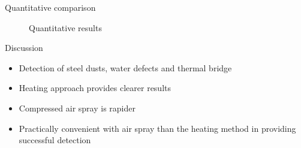 \begin{frame}{Quantitative comparison}

    \begin{figure}
        \hspace*{-20pt}
        \caption{Quantitative results}

    \end{figure}
\end{frame}


\begin{frame}{Discussion}
    \begin{itemize}[<+->]
    \pause
    \large
        \item Detection of steel dusts, water defects and thermal bridge 
        \item Heating approach provides clearer results
        \item Compressed air spray is rapider  
        \item Practically convenient with air spray than the heating method in providing successful detection
    \end{itemize}
\end{frame}
